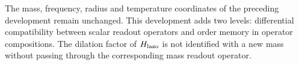 The mass, frequency, radius and temperature coordinates of the
preceding development remain unchanged. This development adds two
levels: differential compatibility between scalar readout operators
and order memory in operator compositions.
The dilation factor of \(H_{\rm lazo}\) is not identified with a new
mass without passing through the corresponding mass readout operator.
